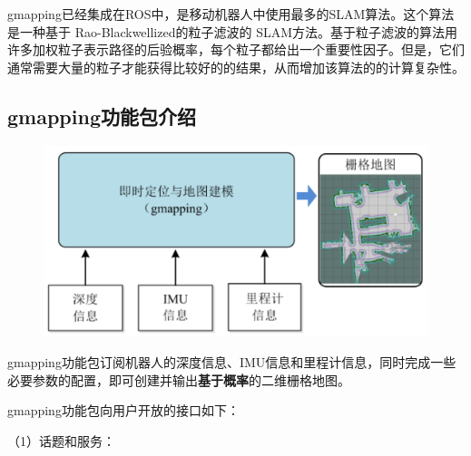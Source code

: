 \documentclass[10pt, oneside]{book}
\begin{document}
gmapping已经集成在ROS中，是移动机器人中使用最多的SLAM算法。这个算法是一种基于 Rao-Blackwellized的粒子滤波的 SLAM方法。基于粒子滤波的算法用许多加权粒子表示路径的后验概率，每个粒子都给出一个重要性因子。但是，它们通常需要大量的粒子才能获得比较好的的结果，从而增加该算法的的计算复杂性。

\subsection{gmapping功能包介绍}

\begin{figure}[H]
    \centering
    \includegraphics[width=0.5\linewidth]{image/gmapping框架.png}
\end{figure}

gmapping功能包订阅机器人的深度信息、IMU信息和里程计信息，同时完成一些必要参数的配置，即可创建并输出\textbf{基于概率}的二维栅格地图。

gmapping功能包向用户开放的接口如下：

（1）话题和服务：
\end{document}

